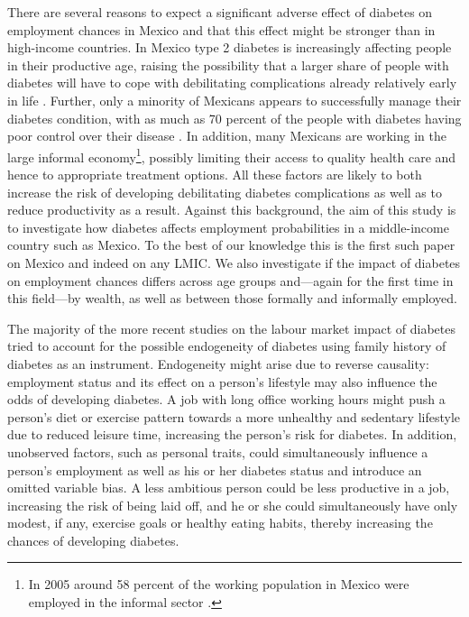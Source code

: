 There are several reasons to expect a significant adverse
effect of diabetes on employment chances in Mexico and that this effect
might be stronger than in high-income countries. In Mexico type 2
diabetes is increasingly affecting people in their productive age,
raising the possibility that a larger share of people with diabetes
will have to cope with debilitating complications already relatively
early in life \parencite{Barquera2013,Villalpando2010}. Further, only
a minority of Mexicans appears to successfully manage their diabetes
condition, with as much as 70 percent of the people with diabetes
having poor control over their disease \parencite{Villalpando2010}. In
addition, many Mexicans are working in the large informal economy\footnote{In 2005 around 58 percent of the working population in Mexico were
employed in the informal sector \parencite{Aguila2011}.}, possibly limiting their access to quality health care and hence
to appropriate treatment options. All these factors are likely to
both increase the risk of developing debilitating diabetes complications
as well as to reduce productivity as a result. Against this background,
the aim of this study is to investigate how diabetes affects employment
probabilities in a middle-income country such as Mexico. To the best
of our knowledge this is the first such paper on Mexico and indeed
on any \ac{LMIC}. We also investigate if the impact of diabetes on
employment chances differs across age groups and---again for the
first time in this field---by wealth, as well as between those formally
and informally employed.

The majority of the more recent studies on the labour market
impact of diabetes tried to account for the possible endogeneity of
diabetes using family history of diabetes as an instrument. Endogeneity
might arise due to reverse causality: employment status and its effect
on a person's lifestyle may also influence the odds of developing
diabetes. A job with long office working hours might push a person's
diet or exercise pattern towards a more unhealthy and sedentary lifestyle
due to reduced leisure time, increasing the person's risk for diabetes.
In addition, unobserved factors, such as personal traits, could simultaneously
influence a person's employment as well as his or her diabetes status
and introduce an omitted variable bias. A less ambitious person could
be less productive in a job, increasing the risk of being laid off,
and he or she could simultaneously have only modest, if any, exercise
goals or healthy eating habits, thereby increasing the chances of
developing diabetes.

